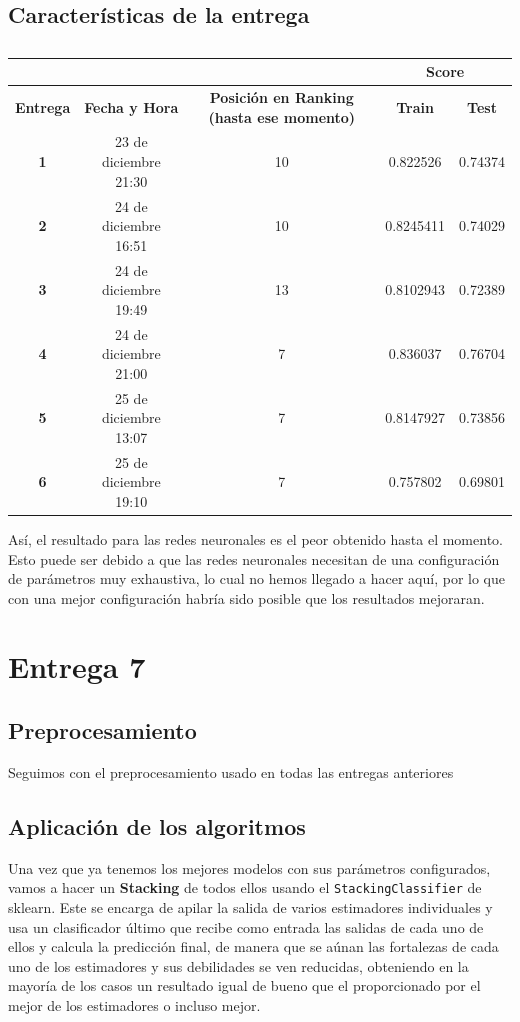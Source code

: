 \documentclass[a4paper,11pt]{article}
\begin{document}
\subsection{Características de la entrega}
\begin{table}[htbp]
	\caption{}\begin{center}
		\begin{tabular}{|c|c|c|c|c|}
			\hline
			\multicolumn{1}{|l|}{\textbf{}} & \textbf{} & \textbf{} & \multicolumn{ 2}{c|}{\textbf{Score}} \\ \hline
			\textbf{Entrega} & \textbf{Fecha y Hora} & \textbf{Posición en Ranking (hasta ese momento)} & \textbf{Train} & \textbf{Test} \\ \hline
			\textbf{1} & 23 de diciembre 21:30 & 10 & 0.822526 & 0.74374 \\ \hline
			\textbf{2} &  24 de diciembre  16:51 & 10 & 0.8245411 & 0.74029 \\ \hline
			\textbf{3} & 24  de diciembre 19:49 & 13 & 0.8102943 & 0.72389 \\ \hline
			\textbf{4} & 24 de diciembre 21:00  & 7 & 0.836037 & 0.76704 \\ \hline
			\textbf{5} &  25 de diciembre 13:07 & 7 & 0.8147927 & 0.73856 \\ \hline
			\textbf{6} & 25  de diciembre  19:10  & 7 & 0.757802 & 0.69801 \\ \hline
	\end{tabular}\end{center}
	\label{}
\end{table}

Así, el resultado para las redes neuronales es el peor obtenido hasta el momento. Esto puede ser debido a que las redes neuronales necesitan de una configuración de parámetros muy exhaustiva, lo cual no hemos llegado a hacer aquí, por lo que con una mejor configuración habría sido posible que los resultados mejoraran. 

\section{Entrega 7}
\subsection{Preprocesamiento}
Seguimos con el preprocesamiento usado en todas las entregas anteriores
\subsection{Aplicación de los algoritmos}
Una vez que ya tenemos los mejores modelos con sus parámetros configurados, vamos a hacer un \textbf{Stacking} de todos ellos usando el \texttt{StackingClassifier} de sklearn. Este se encarga de apilar la salida de varios estimadores individuales y usa un clasificador último que recibe como entrada las salidas de cada uno de ellos y calcula la predicción final, de manera que se aúnan las fortalezas de cada uno de los estimadores y sus debilidades se ven reducidas, obteniendo en la mayoría de los casos un resultado igual de bueno que el proporcionado por el mejor de los estimadores o incluso mejor. 
\end{document}
